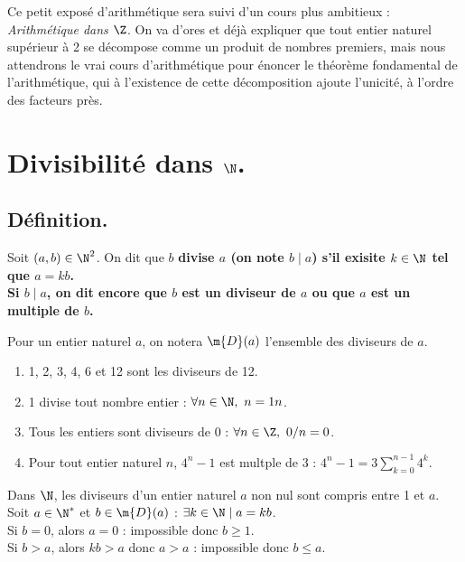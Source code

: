\documentclass[11pt]{article}
\begin{document}


\thispagestyle{fancy}

Ce petit exposé d'arithmétique sera suivi d'un cours plus ambitieux : \emph{Arithmétique dans $\Z$}.\n
On va d'ores et déjà expliquer que tout entier naturel supérieur à 2 se décompose comme un produit de nombres premiers, mais nous attendrons le vrai cours d'arithmétique pour énoncer le théorème fondamental de l'arithmétique, qui à l'existence de cette décomposition ajoute l'unicité, à l'ordre des facteurs près.

\section{Divisibilité dans \texorpdfstring{$\N$}{Lg}.}

\subsection{Définition.}

\begin{defi}{}{}
    Soit $(a,b)\in\N^2$. On dit que $b$ \bf{divise} $a$ (on note $b\mid a$) s'il exisite $k\in\N$ tel que $a=kb$.\\
    Si $b\mid a$, on dit encore que $b$ est un \bf{diviseur} de $a$ ou que $a$ est un \bf{multiple} de $b$.
\end{defi}

Pour un entier naturel $a$, on notera $\m{D}(a)$ l'ensemble des diviseurs de $a$.

\begin{ex}{}{}
    \begin{enumerate}
        \item 1, 2, 3, 4, 6 et 12 sont les diviseurs de 12.
        \item 1 divise tout nombre entier : $\forall n \in \N, ~ n = 1n$.
        \item Tous les entiers sont diviseurs de 0 : $\forall n\in\Z, ~ 0/n=0$.
        \item Pour tout entier naturel $n$, $4^n-1$ est multple de 3 : $4^n-1=3\sum_{k=0}^{n-1}4^k$.
    \end{enumerate}
\end{ex}

\begin{prop}{}{}
    Dans $\N$, les diviseurs d'un entier naturel $a$ non nul sont compris entre 1 et $a$.
    \tcblower
    Soit $a\in\N^*$ et $b\in\m{D}(a)$ : $\exists k \in \N \mid a = kb$.\\
    Si $b=0$, alors $a=0$ : impossible donc $b\geq1$.\\
    Si $b>a$, alors $kb>a$ donc $a>a$ : impossible donc $b\leq a$.
\end{prop}
\end{document}

